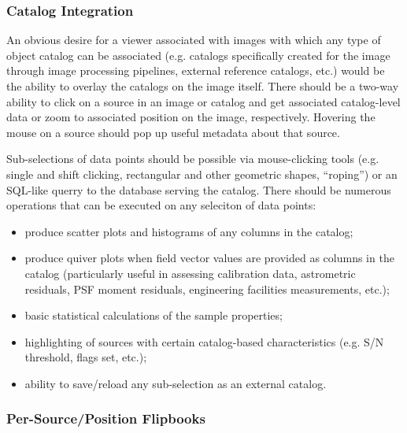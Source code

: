 \subsubsection{Catalog Integration}

An obvious desire for a viewer associated with images with which any type of object catalog can be associated (e.g. catalogs specifically created for the image through image processing pipelines, external reference catalogs, etc.) would be the ability to overlay the catalogs on the image itself.  There should be a two-way ability to click on a source in an image or catalog and get associated catalog-level data or zoom to associated position on the image, respectively.  Hovering the mouse on a source should pop up useful metadata about that source.

Sub-selections of data points should be possible via mouse-clicking tools (e.g. single and shift clicking, rectangular and other geometric shapes, ``roping'') or an SQL-like querry to the database serving the catalog.  There should be numerous operations that can be executed on any seleciton of data points:
\begin{itemize}
\item{produce scatter plots and histograms of any columns in the catalog;}
\item{produce quiver plots when field vector values are provided as columns in the catalog (particularly useful in assessing calibration data, astrometric residuals, PSF moment residuals, engineering facilities measurements, etc.);}
\item{basic statistical calculations of the sample properties;}
\item{highlighting of sources with certain catalog-based characteristics (e.g. S/N threshold, flags set, etc.);}
\item{ability to save/reload any sub-selection as an external catalog.}
\end{itemize}


\subsubsection{Per-Source/Position Flipbooks}


